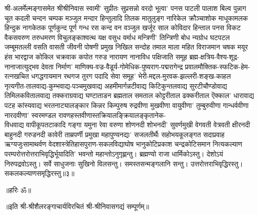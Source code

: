 \begin{flushleft}
श्री-अलर्मेल्मङ्गासमेत श्रीश्रीनिवास स्वामी' सुप्रीतः सुप्रसन्नो वरदो
भूत्वा' पनस पाटली पालाश बिल्व पुन्नाग चूत कदली चन्दन
चम्पक मञ्जुल मन्दार हिन्तुलादि तिलक मातुलुङ्ग नारिकेल
क्रौञ्चाशोक माधूकामलक हिन्दुक नागकेतक पूर्णकुन्द पूर्ण गन्ध रस
कन्द वन वञ्जुल खर्जूर साल कोविदार हिन्ताल पनस विकट
वैकसवरुण तरुधमरण विचुलङ्काश्वत्थ यक्ष वसुध वर्माध मन्त्रिणी'
तिन्त्रिणी बोध न्यग्रोध घटपटल जम्बूमतल्ली वसति वासती जीवनी
पोषणी प्रमुख निखिल सन्दोह तमाल माला महित विराजमान चषक
मयूर हंस भारद्वाज कोकिल चक्रवाक कपोत गरुड नारायण नानाविध पक्षिजाति समूह ब्रह्म-क्षत्रिय-वैश्य-शूद्र-नानाजात्युद्भव देवता
निर्माण' माणिक्य-वज्र-वैडूर्य-गोमेधिक-पुष्यराग-पद्मरागेन्द्र प्रवालमौक्तिक-स्फटिक-हेम-रत्नखचित धगद्धगायमान रथगज
तुरग पदादि सेवा समूह' भेरी-मद्दल-मुरवक-झल्लरी-शङ्ख-काहल नृत्यगीत-तालवाद्य-कुम्भवाद्य-पञ्चमुखवाद्य अहमीमार्गन्नटीवाद्य किटिकुन्तलवाद्य सुरटीचौण्डोवाद्य तिमिलकवितालवाद्य
तक्कराग्रवाद्य घण्टाताडन ब्रह्मताल समताल कोट्टरीताल ढक्करीताल ऎक्काल' धारावाद्य पटह कांस्यवाद्य भरतनाट्यालङ्कार किन्नर किम्पुरुष
रुद्रवीणा मुखवीणा वायुवीणा' तुम्बुरुवीणा गान्धर्ववीणा नारदवीणा' स्वरमण्डल रावणहस्तवीणास्तक्रियालङ्क्रियालङ्कृतानेक-\\विधवाद्य वापीकूपतटाकादि गङ्गा यमुना रेवा वरुणा शोणनदी शोभनदी'
सुवर्णमुखी वेगवती वेत्रवती क्षीरनदी बाहुनदी गरुडनदी कावेरी ताम्रपर्णी प्रमुखा महापुण्यनद्यः' सजलतीर्थैः सहोभयकूलङ्गत सदाप्रवाह ऋग्यजुःसामाथर्वण वेदशास्त्रेतिहासपुराण-सकलविद्याघोष भानुकोटिप्रकाश चन्द्रकोटिसमान नित्यकल्याण परम्परोत्तरोत्तराभिवृद्धिर्भूयादिति' भवन्तो महान्तोऽनुगृह्णन्तु।
ब्रह्मण्यो राजा धार्मिकोऽस्तु। देशोऽयं निरुपद्रवोऽस्तु।
सर्वे साधुजनाः सुखिनो विलसन्तु। समस्तसन्मङ्गलानि सन्तु। उत्तरोत्तराभिवृद्धिरस्तु। सकलकल्याणसमृद्धिरस्तु॥३॥
\centerline{॥हरिः ॐ॥}
\centerline{॥इति श्री-श्रीशैलरङ्गाचार्यविरचितं श्री-श्रीनिवासगद्यं सम्पूर्णम्॥}
\end{flushleft}